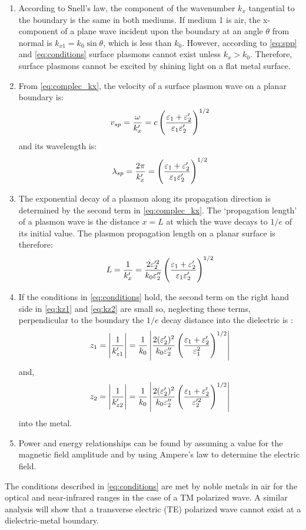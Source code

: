 \documentclass[11pt]{article}
\begin{document}
\begin{enumerate}
  \item	According to Snell's law, the component of the wavenumber $k_x$ tangential to the boundary is the same in both mediums. If medium 1 is air, the x-component of a plane wave incident upon the boundary at an angle $\theta$ from normal is $k_{x1} = k_0 \sin \theta$, which is less than $k_0$. However, according to \eqref{eq:spp} and \eqref{eq:conditions} surface plasmons cannot exist unless $k_x > k_0$. Therefore, surface plasmons cannot be excited by shining light on a flat metal surface.
  \item	From \eqref{eq:complec_kx}, the velocity of a surface plasmon wave on a planar boundary is:
  \begin{equation}
    v_{sp} = \frac{\omega}{k_x'} = c \left( \frac{\varepsilon_1 + \varepsilon_2'}{\varepsilon_1 \varepsilon_2'} \right)^{1/2}
    \label{eq:velocity}
  \end{equation}
  and its wavelength is:
  \begin{equation}
    \lambda_{sp} = \frac{2 \pi}{k_x'} = \left( \frac{\varepsilon_1 + \varepsilon_2'}{\varepsilon_1 \varepsilon_2'} \right)^{1/2}
    \label{eq:wavelength}
  \end{equation}
  \item	The exponential decay of a plasmon along its propagation direction is determined by the second term in \eqref{eq:complec_kx}. The `propagation length' of a plasmon wave is the distance $x = L$ at which the wave decays to   $1/e$ of its initial value. The plasmon propagation length on a planar surface is therefore:
  \begin{equation}
    L = \frac{1}{k_x'} = \frac{2 \varepsilon_2'^2}{k_0 \varepsilon_2''} \left( \frac{\varepsilon_1 + \varepsilon_2'}{\varepsilon_1 \varepsilon_2'} \right)^{1/2}
    \label{eq:plength}
  \end{equation}
  \item	If the conditions in \eqref{eq:conditions} hold, the second term on the right hand side in \eqref{eq:kz1} and \eqref{eq:kz2} are small so, neglecting these terms, perpendicular to the boundary the $1/e$ decay distance into the dielectric is \cite{Raether1988}:
  \begin{equation}
    z_1 = \left| \frac{1}{k_{z1}'} \right| = \frac{1}{k_0} \left| \frac{2 (\varepsilon_2')^2}{k_0 \varepsilon_2''} \left( \frac{\varepsilon_1 + \varepsilon_2'}{\varepsilon_1^2} \right)^{1/2} \right|
    \label{eq:decay_dielectric}
  \end{equation}
  and,
  \begin{equation}
    z_2 = \left| \frac{1}{k_{z2}'} \right| = \frac{1}{k_0} \left| \frac{2 (\varepsilon_2')^2}{k_0 \varepsilon_2''} \left( \frac{\varepsilon_1 + \varepsilon_2'}{\varepsilon_2'^2} \right)^{1/2} \right|
    \label{eq:decay_metal}
  \end{equation}
  into the metal.
  \item	Power and energy relationships can be found by assuming a value for the magnetic field amplitude and by using Ampere's law to determine the electric field.
\end{enumerate}
%
The conditions described in \eqref{eq:conditions} are met by noble metals in air for the optical and near-infrared ranges in the case of a TM polarized wave. A similar analysis will show that a transverse electric (TE) polarized wave cannot exist at a dielectric-metal boundary.
\end{document}
